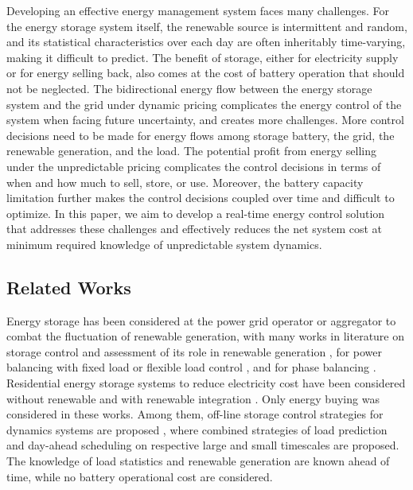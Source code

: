 \documentclass[journal]{IEEEtran}
\begin{document}
Developing an effective energy management system faces many challenges. For the energy storage system itself, the renewable source is intermittent and   random, and its statistical characteristics over each day are often inheritably  time-varying, making it difficult to predict.
The benefit of storage, either for electricity supply or for  energy selling back,  also comes at the cost of battery operation that should not be neglected.
The bidirectional energy flow between the energy storage system and the grid under  dynamic pricing complicates  the energy control of the system when facing future uncertainty, and creates more challenges. More control decisions need to be made for energy flows  among storage battery, the grid, the renewable generation, and the load. The potential profit from energy selling under the unpredictable pricing complicates the control decisions  in terms of when and how much to sell, store, or use. Moreover, the battery capacity limitation further makes the control decisions coupled over time and difficult to
optimize. In this paper, we aim to develop a real-time energy control solution that  addresses these challenges and effectively reduces the net system cost at minimum required knowledge of unpredictable system dynamics.




\subsection{Related Works}
Energy storage has been considered at the power grid operator or aggregator to combat the fluctuation of renewable generation, with many works in literature on storage control and assessment of its role in renewable generation \cite{CastilloGayme:Elsevier14}, for power balancing with fixed load \cite{SuGamal:TPS13,SunDongLiang:JSTSP14} or flexible load control \cite{ZhangGatsis_TSE13,SunDongLiang:TSG16}, and for phase balancing \cite{SunLiangDongTaylor:TPS16}. Residential energy storage systems to reduce electricity cost have been considered without renewable \cite{Urgaonkar&Neely:SIGMETRICS2011} and with renewable integration \cite{He&Zhang_TSG12,RahbarXu:TSG15,Wang&etal:TSG14,Huang&Walrand&Ramchandran:SmatGridComm12,
Sergio&Ming&Pan&Yong_TSG13,Li&Dong:ICASSP2013,Li&Dong:acssc2013,Li&Dong:SmartGridComm14,Li&Dong:JSAC15,Li&Dong:TSG16,Qinetal:TSG16}. Only energy buying was considered in these works.  Among them, off-line storage control  strategies for dynamics systems are proposed \cite{He&Zhang_TSG12,RahbarXu:TSG15,Wang&etal:TSG14}, where combined strategies of load prediction and day-ahead scheduling on respective large and small
timescales are proposed. The knowledge of load statistics  and renewable  generation are known ahead of time, while no battery operational cost are considered.
\end{document}

